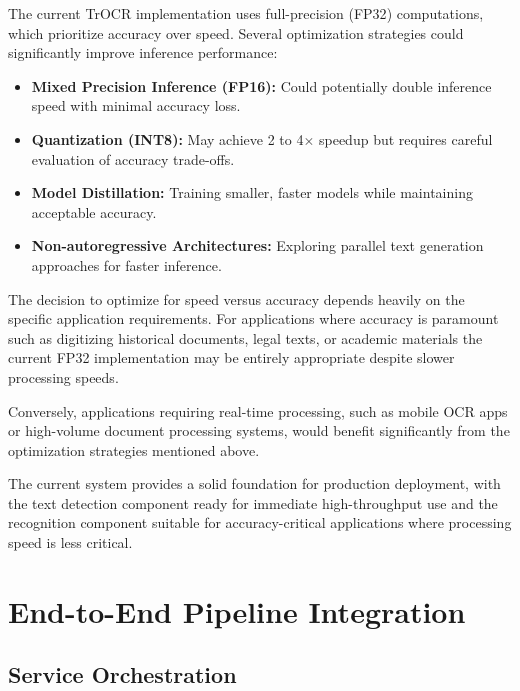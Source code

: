 {The current {\englishfont\selectfont TrOCR} implementation uses full-precision ({\englishfont\selectfont FP32}) computations, which prioritize accuracy over speed. Several optimization strategies could significantly improve inference performance:

\begin{itemize}
    \item \textbf{Mixed Precision Inference (FP16):} Could potentially double inference speed with minimal accuracy loss.
    \item \textbf{Quantization (INT8):} May achieve 2 to 4$\times$ speedup but requires careful evaluation of accuracy trade-offs.
    \item \textbf{Model Distillation:} Training smaller, faster models while maintaining acceptable accuracy.
    \item \textbf{Non-autoregressive Architectures:} Exploring parallel text generation approaches for faster inference.
\end{itemize}


The decision to optimize for speed versus accuracy depends heavily on the specific application requirements. For applications where accuracy is paramount such as digitizing historical documents, legal texts, or academic materials the current {\englishfont\selectfont FP32} implementation may be entirely appropriate despite slower processing speeds.

Conversely, applications requiring real-time processing, such as mobile OCR apps or high-volume document processing systems, would benefit significantly from the optimization strategies mentioned above.

\vspace{0.3cm}
\noindent
The current system provides a solid foundation for production deployment, with the text detection component ready for immediate high-throughput use and the recognition component suitable for accuracy-critical applications where processing speed is less critical.


\section{End-to-End Pipeline Integration}
\label{sec:pipeline-integration}

\subsection{Service Orchestration}
\label{subsec:orchestration}

}
